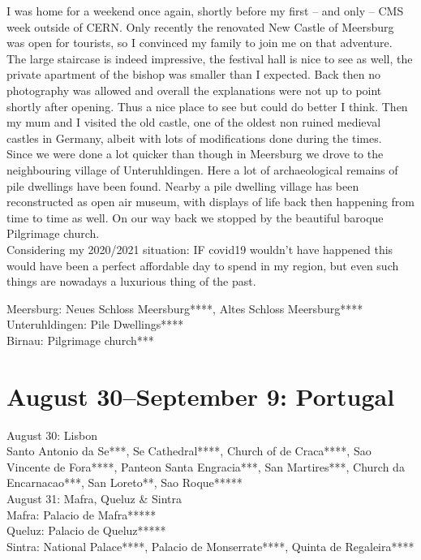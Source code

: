 I was home for a weekend once again, shortly before my first -- and only -- CMS week outside of CERN. Only recently the renovated New Castle of Meersburg was open for tourists, so I convinced my family to join me on that adventure. The large staircase is indeed impressive, the festival hall is nice to see as well, the private apartment of the bishop was smaller than I expected. Back then no photography was allowed and overall the explanations were not up to point shortly after opening. Thus a nice place to see but could do better I think. Then my mum and I visited the old castle, one of the oldest non ruined medieval castles in Germany, albeit with lots of modifications done during the times.\\
Since we were done a lot quicker than though in Meersburg we drove to the neighbouring village of Unteruhldingen. Here a lot of archaeological remains of pile dwellings have been found. Nearby a pile dwelling village has been reconstructed as open air museum, with displays of life back then happening from time to time as well. On our way back we stopped by the beautiful baroque Pilgrimage church.\\
Considering my 2020/2021 situation: IF covid19 wouldn't have happened this would have been a perfect affordable day to spend in my region, but even such things are nowadays a luxurious thing of the past.

Meersburg: Neues Schloss Meersburg****, Altes Schloss Meersburg****\\
Unteruhldingen: Pile Dwellings****\\
Birnau: Pilgrimage church***

\section{August 30--September 9: Portugal}
\label{Portugal2012}

August 30: Lisbon\\
Santo Antonio da Se***, Se Cathedral****, Church of de Craca****, Sao Vincente de Fora****,  Panteon Santa Engracia***, San Martires***, Church da Encarnacao***, San Loreto**, Sao Roque*****\\

August 31: Mafra, Queluz \& Sintra\\
Mafra: Palacio de Mafra*****\\
Queluz: Palacio de Queluz*****\\
Sintra: National Palace****, Palacio de Monserrate****, Quinta de Regaleira****\\

